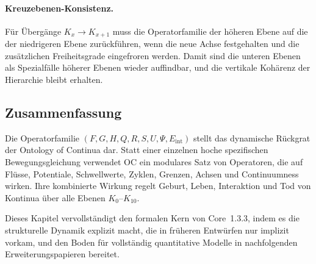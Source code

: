 \paragraph{Kreuzebenen-Konsistenz.}
Für Übergänge \(K_x \to K_{x+1}\) muss die Operatorfamilie der höheren Ebene auf
die der niedrigeren Ebene zurückführen, wenn die neue Achse festgehalten und die
zusätzlichen Freiheitsgrade eingefroren werden. Damit sind die unteren Ebenen
als Spezialfälle höherer Ebenen wieder auffindbar, und die vertikale
Kohärenz der Hierarchie bleibt erhalten.

\subsection{Zusammenfassung}

Die Operatorfamilie \((F, G, H, Q, R, S, U, \Psi, E_{\mathrm{int}})\) stellt
das dynamische Rückgrat der Ontology of Continua dar. Statt einer einzelnen
hoche spezifischen Bewegungsgleichung verwendet OC ein modulares Satz von
Operatoren, die auf Flüsse, Potentiale, Schwellwerte, Zyklen, Grenzen, Achsen
und Continuumness wirken. Ihre kombinierte Wirkung regelt Geburt, Leben,
Interaktion und Tod von Kontinua über alle Ebenen \(K_0\)–\(K_{10}\).

Dieses Kapitel vervollständigt den formalen Kern von Core~1.3.3, indem es die
strukturelle Dynamik explizit macht, die in früheren Entwürfen nur implizit
vorkam, und den Boden für vollständig quantitative Modelle in nachfolgenden
Erweiterungspapieren bereitet.
